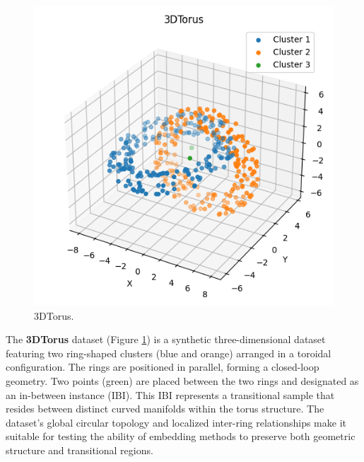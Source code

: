 \begin{figure}
    \centering
    \includegraphics[width=\myimgwidth]{images/datasets/3DTorus.png}
    \caption{3DTorus.}
    \label{fig:3DTorus}
\end{figure}
The \textbf{3DTorus} dataset (Figure \ref{fig:3DTorus}) is a synthetic three-dimensional dataset featuring two ring-shaped clusters (blue and orange) arranged in a toroidal configuration. The rings are positioned in parallel, forming a closed-loop geometry. Two points (green) are placed between the two rings and designated as an in-between instance (IBI). This IBI represents a transitional sample that resides between distinct curved manifolds within the torus structure. The dataset’s global circular topology and localized inter-ring relationships make it suitable for testing the ability of embedding methods to preserve both geometric structure and transitional regions.
\newline

